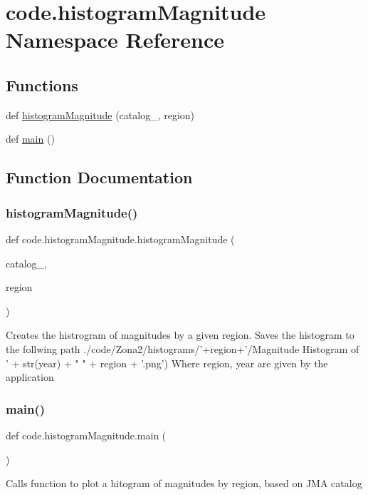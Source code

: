 \hypertarget{namespacecode_1_1histogram_magnitude}{}\section{code.\+histogram\+Magnitude Namespace Reference}
\label{namespacecode_1_1histogram_magnitude}
\subsection*{Functions}
\begin{DoxyCompactItemize}
\item 
def \hyperlink{namespacecode_1_1histogram_magnitude_ae6dbfd8a234211e097b59a626497cc7e}{histogram\+Magnitude} (catalog\+\_\+, region)
\item 
def \hyperlink{namespacecode_1_1histogram_magnitude_aa4f6e6a304da96beb31f99c6a4534c77}{main} ()
\end{DoxyCompactItemize}


\subsection{Function Documentation}
\mbox{\label{namespacecode_1_1histogram_magnitude_ae6dbfd8a234211e097b59a626497cc7e}} 
\subsubsection{\texorpdfstring{histogram\+Magnitude()}{histogramMagnitude()}}
{\footnotesize\ttfamily def code.\+histogram\+Magnitude.\+histogram\+Magnitude (\begin{DoxyParamCaption}\item[{}]{catalog\+\_\+,  }\item[{}]{region }\end{DoxyParamCaption})}

\begin{DoxyVerb}Creates the histrogram of magnitudes by a given region.
Saves the histogram to the follwing path ./code/Zona2/histograms/'+region+'/Magnitude Histogram of ' + str(year) + " " + region + '.png')
Where region, year are given by the application
\end{DoxyVerb}
 \mbox{\label{namespacecode_1_1histogram_magnitude_aa4f6e6a304da96beb31f99c6a4534c77}} 
\subsubsection{\texorpdfstring{main()}{main()}}
{\footnotesize\ttfamily def code.\+histogram\+Magnitude.\+main (\begin{DoxyParamCaption}{ }\end{DoxyParamCaption})}

\begin{DoxyVerb}Calls function to plot a hitogram of magnitudes by region, based on JMA catalog
\end{DoxyVerb}
 